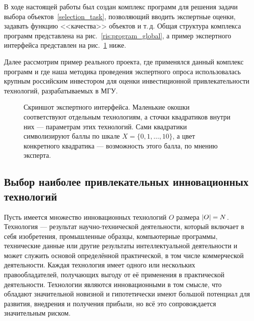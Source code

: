 
\label{sec:examples}

В ходе настоящей работы был создан комплекс программ для решения задачи выбора объектов~\ref{selection_task}, позволяющий вводить экспертные оценки, задавать функцию <<качества>> объектов и т.\,д. Общая структура комплекса программ представлена на рис.~\ref{ris:program_global}, а пример экспертного интерфейса представлен на рис.~\ref{ris:interface} ниже.

Далее рассмотрим пример реального проекта, где применялся данный комплекс программ и где наша методика проведения экспертного опроса использовалась крупным российским инвестором для оценки инвестиционной привлекательности технологий, разрабатываемых в МГУ.

\begin{figure}[h]
\caption{\small Скриншот экспертного интерфейса. Маленькие окошки соответствуют отдельным технологиям, а сточки квадратиков внутри них --- параметрам этих технологий. Сами квадратики символизируют баллы по шкале $X = \{0, 1, \ldots, 10\}$, а цвет конкретного квадратика --- возможность этого балла, по мнению эксперта. }
\label{ris:interface}
\end{figure}

\subsection{Выбор наиболее привлекательных инновационных технологий}


Пусть имеется множество инновационных технологий $O$ размера $\left| O \right| = N$.  Технология --- результат научно-технической деятельности, который включает в себя изобретения, промышленные образцы, компьютерные программы, технические данные или другие результаты интеллектуальной деятельности и может служить основой определённой практической, в том числе коммерческой деятельности. Каждая технология имеет одного или нескольких правообладателей, получающих выгоду от её применения в практической деятельности. Технологии являются инновационными в том смысле, что обладают значительной новизной и гипотетически имеют большой потенциал для развития, внедрения и получения прибыли, но всё это сопровождается значительным риском. 

